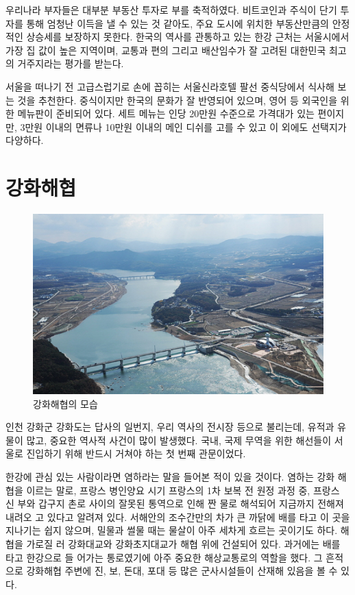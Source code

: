 우리나라 부자들은 대부분 부동산 투자로 부를 축적하였다. 비트코인과 주식이 단기
투자를 통해 엄청난 이득을 낼 수 있는 것 같아도, 주요 도시에 위치한 부동산만큼의 안정
적인 상승세를 보장하지 못한다. 한국의 역사를 관통하고 있는 한강 근처는 서울시에서 
가장 집 값이 높은 지역이며, 교통과 편의 그리고 배산임수가 잘 고려된 대한민국 최고의 
거주지라는 평가를 받는다.

서울을 떠나기 전 고급스럽기로 손에 꼽히는 서울신라호텔 팔선 중식당에서 식사해
보는 것을 추천한다. 중식이지만 한국의 문화가 잘 반영되어 있으며, 영어 등 외국인을 위
한 메뉴판이 준비되어 있다. 세트 메뉴는 인당 20만원 수준으로 가격대가 있는 편이지만,
3만원 이내의 면류나 10만원 이내의 메인 디쉬를 고를 수 있고 이 외에도 선택지가 다양하다.



\section{강화해협}


\begin{figure}
    \centering
    \includegraphics[width=.6\textwidth]{e_img/ww_-008.jpg}
    \caption{강화해협의 모습}
    \label{fig:haryu9}
\end{figure}

인천 강화군 강화도는 답사의 일번지, 우리 역사의 전시장 등으로 불리는데, 유적과
유물이 많고, 중요한 역사적 사건이 많이 발생했다. 국내, 국제 무역을 위한 해선들이 
서울로 진입하기 위해 반드시 거쳐야 하는 첫 번째 관문이었다.


한강에 관심 있는 사람이라면 염하라는 말을 들어본 적이 있을 것이다. 염하는 강화
해협을 이르는 말로, 프랑스 병인양요 시기 프랑스의 1차 보복 전 원정 과정 중, 프랑스 신
부와 갑구지 촌로 사이의 잘못된 통역으로 인해 짠 물로 해석되어 지금까지 전해져 내려오
고 있다고 알려져 있다. 서해안의 조수간만의 차가 큰 까닭에 배를 타고 이 곳을 지나기는
쉽지 않으며, 밀물과 썰물 때는 물살이 아주 세차게 흐르는 곳이기도 하다. 해협을 가로질
러 강화대교와 강화초지대교가 해협 위에 건설되어 있다. 과거에는 배를 타고 한강으로 들
어가는 통로였기에 아주 중요한 해상교통로의 역할을 했다. 그 흔적으로 강화해협 주변에
진, 보, 돈대, 포대 등 많은 군사시설들이 산재해 있음을 볼 수 있다.

